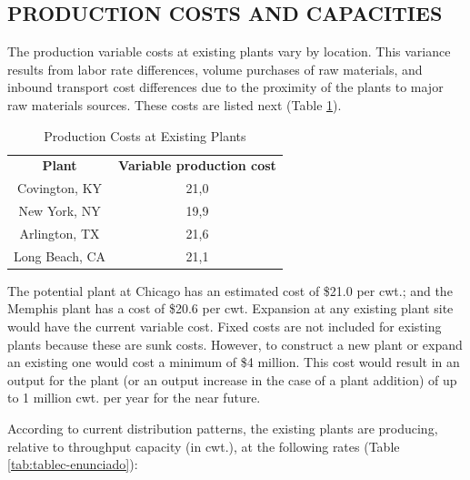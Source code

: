 \documentclass[12pt,a4paper]{article}
\begin{document}
\subsection{PRODUCTION COSTS AND CAPACITIES}

The production variable costs at existing plants vary by location.
This variance results from labor rate differences, volume purchases of raw materials, and inbound transport cost differences due to the proximity of the plants to major raw materials sources.
These costs are listed next (Table \ref{tab:tableb-enunciado}).

\begin{table}[!h]
    \centering
    \caption{Production Costs at Existing Plants}
    \label{tab:tableb-enunciado}
    \begin{tabular}{|c|c|}
    \hline
    \textbf{Plant} & \textbf{Variable production cost} \\
    Covington, KY  & 21,0                              \\
    New York, NY   & 19,9                              \\
    Arlington, TX  & 21,6                              \\
    Long Beach, CA & 21,1                              \\
    \hline
\end{tabular}
\end{table}

The potential plant at Chicago has an estimated cost of \$21.0 per cwt.;
and the Memphis plant has a cost of \$20.6 per cwt.
Expansion at any existing plant site would have the current variable cost.
Fixed costs are not included for existing plants because these are sunk costs.
However, to construct a new plant or expand an existing one would cost a minimum of \$4 million.
This cost would result in an output for the plant (or an output increase in the case of a plant addition) of up to 1 million cwt. per year for the near future.

According to current distribution patterns, the existing plants are producing, relative to throughput capacity (in cwt.), at the following rates (Table \ref{tab:tablec-enunciado}):
\end{document}
